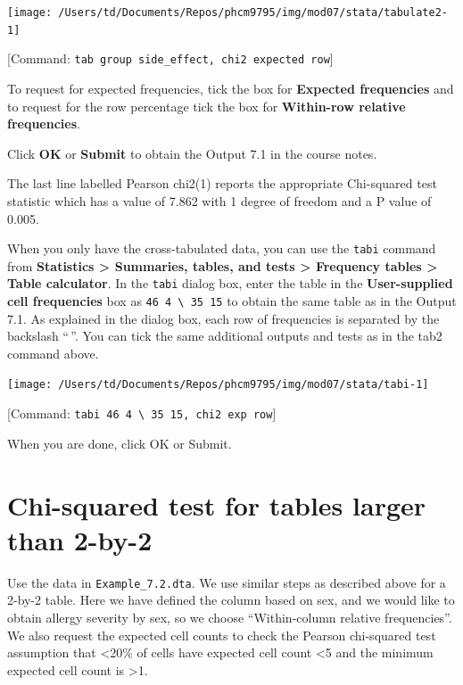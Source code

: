 \documentclass[
]{memoir}
\begin{document}
\texttt{[image: /Users/td/Documents/Repos/phcm9795/img/mod07/stata/tabulate2-1]}

{[}Command: \texttt{tab\ group\ side\_effect,\ chi2\ expected\ row}{]}

To request for expected frequencies, tick the box for \textbf{Expected frequencies} and to request for the row percentage tick the box for \textbf{Within-row relative frequencies}.

Click \textbf{OK} or \textbf{Submit} to obtain the Output 7.1 in the course notes.

The last line labelled Pearson chi2(1) reports the appropriate Chi-squared test statistic which has a value of 7.862 with 1 degree of freedom and a P value of 0.005.

When you only have the cross-tabulated data, you can use the \texttt{tabi} command from \textbf{Statistics \textgreater{} Summaries, tables, and tests \textgreater{} Frequency tables \textgreater{} Table calculator}. In the \texttt{tabi} dialog box, enter the table in the \textbf{User-supplied cell frequencies} box as \texttt{46\ 4\ \textbackslash{}\ 35\ 15} to obtain the same table as in the Output 7.1. As explained in the dialog box, each row of frequencies is separated by the backslash ``\,''. You can tick the same additional outputs and tests as in the tab2 command above.

\texttt{[image: /Users/td/Documents/Repos/phcm9795/img/mod07/stata/tabi-1]}

{[}Command: \texttt{tabi\ 46\ 4\ \textbackslash{}\ 35\ 15,\ chi2\ exp\ row}{]}

When you are done, click OK or Submit.

\hypertarget{chi-squared-test-for-tables-larger-than-2-by-2}{%
\section{Chi-squared test for tables larger than 2-by-2}\label{chi-squared-test-for-tables-larger-than-2-by-2}}

Use the data in \texttt{Example\_7.2.dta}. We use similar steps as described above for a 2-by-2 table. Here we have defined the column based on sex, and we would like to obtain allergy severity by sex, so we choose ``Within-column relative frequencies''. We also request the expected cell counts to check the Pearson chi-squared test assumption that \textless20\% of cells have expected cell count \textless5 and the minimum expected cell count is \textgreater1.
\end{document}

